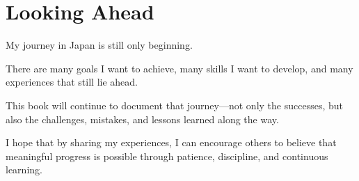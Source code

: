 \section{Looking Ahead}

My journey in Japan is still only beginning.

There are many goals I want to achieve, many skills I want to develop, and many experiences that still lie ahead.

This book will continue to document that journey—not only the successes, but also the challenges, mistakes, and lessons learned along the way.

I hope that by sharing my experiences, I can encourage others to believe that meaningful progress is possible through patience, discipline, and continuous learning.
